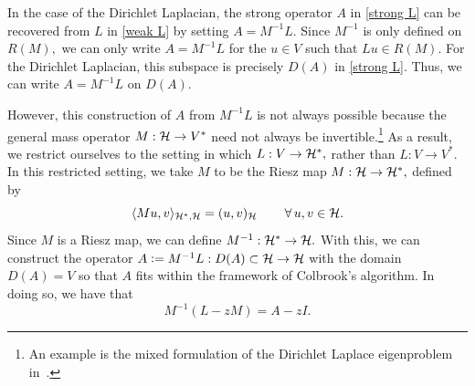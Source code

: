 In the case of the Dirichlet Laplacian,  the strong operator $A$ in \eqref{strong L} can be recovered from $L$ in \eqref{weak L} by setting $A = M^{-1}L.$ Since $M^{-1}$ is only defined on $R(M),$ we can only write $A = M^{-1}L$ for the $u \in V$ such that $Lu \in R(M).$ For the Dirichlet Laplacian, this subspace is precisely $D(A)$ in \eqref{strong L}. Thus, we can write $A = M^{-1}L$ on $D(A).$


However, this construction of $A$ from $M^{-1}L$ is not always possible because the general mass operator $M : \mathcal{H} \rightarrow V^*$ need not always be invertible.\footnote{An example is the mixed formulation of the Dirichlet Laplace eigenproblem in~\cite[Section~4.5]{Boffi}.}
As a result, we restrict ourselves to the setting in which $L: V \rightarrow \mathcal{H}^*,$ rather than $L: V \rightarrow V^*\!.$ In this restricted setting, we take $M$ to be the Riesz map $M : \mathcal{H} \rightarrow \mathcal{H}^*,$ defined by
\begin{equation} \label{M form}
    \langle Mu, v\rangle_{\mathcal{H}^*, \mathcal{H}} = (u, v)_{\mathcal{H}} \qquad \operatorname{\forall} u, v \in \mathcal{H}.
\end{equation}
Since $M$ is a Riesz map, we can define $M^{-1}: \mathcal{H}^* \rightarrow \mathcal{H}.$ With this, we can construct the operator $A \vcentcolon= M^{-1} L : D(A) \subset \mathcal{H} \rightarrow \mathcal{H}$ with the domain $D(A) = V$ so that $A$ fits within the framework of Colbrook's algorithm. 
In doing so, we have that 
\begin{equation} \label{A-zI}
    M^{-1} (L-zM) = A - zI.
\end{equation}



